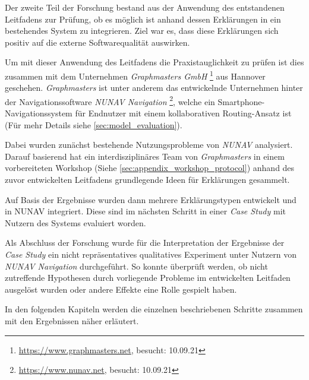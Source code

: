 \bigbreak

Der zweite Teil der Forschung bestand aus der Anwendung des entstandenen Leitfadens zur Prüfung, ob es möglich ist anhand dessen Erklärungen in ein bestehendes System zu integrieren. Ziel war es, dass diese Erklärungen sich positiv auf die externe Softwarequalität auswirken.

Um mit dieser Anwendung des Leitfadens die Praxistauglichkeit zu prüfen ist dies zusammen mit dem Unternehmen \textit{Graphmasters GmbH} \footnote{\url{https://www.graphmasters.net}, besucht: 10.09.21} aus Hannover geschehen. \textit{Graphmasters} ist unter anderem das entwickelnde Unternehmen hinter der Navigationssoftware \textit{NUNAV Navigation} \footnote{\url{https://www.nunav.net}, besucht: 10.09.21}, welche ein Smartphone-Navigationssystem für Endnutzer mit einem kollaborativen Routing-Ansatz ist (Für mehr Details siehe \autoref{sec:model_evaluation}).

Dabei wurden zunächst bestehende Nutzungsprobleme von \textit{NUNAV} analysiert. Darauf basierend hat ein interdisziplinäres Team von \textit{Graphmasters} in einem vorbereiteten Workshop (Siehe \autoref{sec:appendix_workshop_protocol}) anhand des zuvor entwickelten Leitfadens grundlegende Ideen für Erklärungen gesammelt.

Auf Basis der Ergebnisse wurden dann mehrere Erklärungstypen entwickelt und in NUNAV integriert. Diese sind im nächsten Schritt in einer \textit{Case Study} mit Nutzern des Systems evaluiert worden.

Als Abschluss der Forschung wurde für die Interpretation der Ergebnisse der \textit{Case Study} ein nicht repräsentatives qualitatives Experiment unter Nutzern von \textit{NUNAV Navigation} durchgeführt. So konnte überprüft werden, ob nicht zutreffende Hypothesen durch vorliegende Probleme im entwickelten Leitfaden ausgelöst wurden oder andere Effekte eine Rolle gespielt haben.

\bigskip

In den folgenden Kapiteln werden die einzelnen beschriebenen Schritte zusammen mit den Ergebnissen näher erläutert.